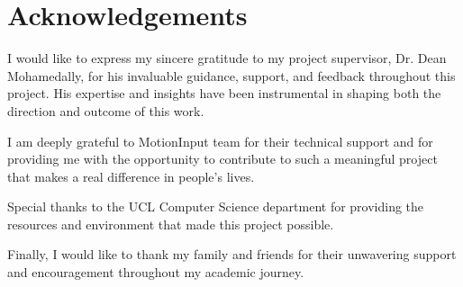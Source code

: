 \chapter*{Acknowledgements}

I would like to express my sincere gratitude to my project supervisor, Dr. Dean Mohamedally, for his invaluable guidance, support, and feedback throughout this project. His expertise and insights have been instrumental in shaping both the direction and outcome of this work.

I am deeply grateful to MotionInput team for their technical support and for providing me with the opportunity to contribute to such a meaningful project that makes a real difference in people's lives.

Special thanks to the UCL Computer Science department for providing the resources and environment that made this project possible.

Finally, I would like to thank my family and friends for their unwavering support and encouragement throughout my academic journey.

\clearpage
